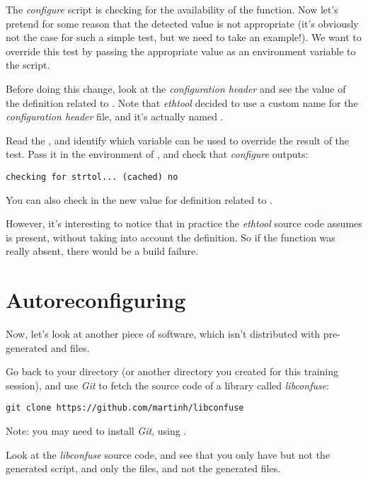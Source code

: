 The {\em configure} script is checking for the availability of the
 function. Now let's pretend for some reason that the
detected value is not appropriate (it's obviously not the case for
such a simple test, but we need to take an example!). We want to
override this test by passing the appropriate value as an environment
variable to the  script.

Before doing this change, look at the
 {\em configuration header} and see the value of the
definition related to . Note that {\em ethtool} decided
to use a custom name for the {\em configuration header} file, and it's
actually named .

Read the , and identify which variable can be used to
override the result of the  test. Pass it in the
environment of , and check that {\em configure}
outputs:

\begin{verbatim}
checking for strtol... (cached) no
\end{verbatim}

You can also check in  the new value for
definition related to .

However, it's interesting to notice that in practice the {\em ethtool}
source code assumes  is present, without taking into
account the  definition. So if the function was
really absent, there would be a build failure.

\section{Autoreconfiguring}

Now, let's look at another piece of software, which isn't distributed
with pre-generated  and  files.

Go back to your  directory (or another directory you
created for this training session), and use {\em Git} to fetch the
source code of a library called {\em libconfuse}:

\begin{verbatim}
git clone https://github.com/martinh/libconfuse
\end{verbatim}

Note: you may need to install {\em Git}, using .

Look at the {\em libconfuse} source code, and see that you only have
 but not the generated  script, and
only the  files, and not the generated
 files.

